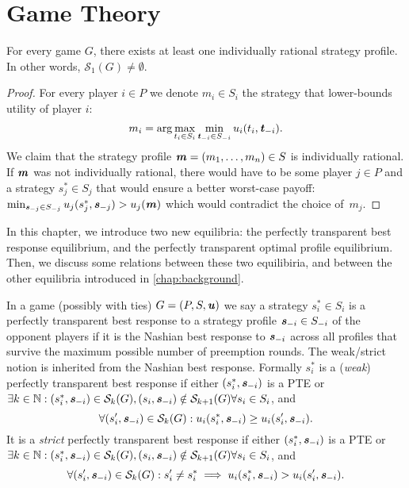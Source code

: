 \chapter{Game Theory}
\label{chap:game-theory}

\begin{lemma}
	For every game $G$, there exists at least one individually rational strategy profile.
	In other words, $\mathcal{S}_1(G) \ne \emptyset$.
\end{lemma}

\begin{proof}
	For every player $i \in P$ we denote $m_i \in S_i$ the strategy that lower-bounds utility of player $i$:
	\[
		m_i = \text{arg} \max_{t_i \in S_i} \min_{\boldsymbol{\mathit{t}}_{-i} \in S_{-i}} u_i(t_i, \boldsymbol{\mathit{t}}_{-i}).
	\]
	We claim that the strategy profile $\boldsymbol{\mathit{m}} = (m_1, \dots, m_n) \in S$ is individually rational.
	If $\boldsymbol{\mathit{m}}$ was not individually rational, there would have to be some player $j \in P$ and a strategy $s_j^* \in S_j$ that would ensure a better worst-case payoff: $\min_{\boldsymbol{\mathit{s}}_{-j} \in S_{-j}}u_j(s_j^*, \boldsymbol{\mathit{s}}_{-j}) > u_j(\boldsymbol{\mathit{m}})$ which would contradict the choice of~$m_j$.
\end{proof}

In this chapter, we introduce two new equilibria: the perfectly transparent best response equilibrium, and the perfectly transparent optimal profile equilibrium.
Then, we discuss some relations between these two equilibiria, and between the other equilibria introduced in \autoref{chap:background}.

\begin{definition}
	In a game (possibly with ties) $G = (P, S, \boldsymbol{\mathit{u}})$ we say a strategy $s_i^* \in S_i$ is a perfectly transparent best response to a strategy profile $\boldsymbol{\mathit{s}}_{-i} \in S_{-i}$ of the opponent players if it is the Nashian best response to $\boldsymbol{\mathit{s}}_{-i}$ across all profiles that survive the maximum possible number of preemption rounds.
	The weak/strict notion is inherited from the Nashian best response.
	Formally $s_i^*$ is a (\textit{weak}) perfectly transparent best response if either $(s_i^*, \boldsymbol{\mathit{s}}_{-i})$ is a PTE or $\exists k \in \mathbb{N}: (s_i^*, \boldsymbol{\mathit{s}}_{-i}) \in \mathcal{S}_k(G), (s_i, \boldsymbol{\mathit{s}}_{-i}) \notin \mathcal{S}_{k+1}(G) \forall s_i \in S_i$, and
	\[
		\forall (s_i', \boldsymbol{\mathit{s}}_{-i}) \in \mathcal{S}_k(G): u_i(s_i^*, \boldsymbol{\mathit{s}}_{-i}) \ge u_i(s_i', \boldsymbol{\mathit{s}}_{-i}).
	\]
	It is a \textit{strict} perfectly transparent best response if either $(s_i^*, \boldsymbol{\mathit{s}}_{-i})$ is a PTE or $\exists k \in \mathbb{N}: (s_i^*, \boldsymbol{\mathit{s}}_{-i}) \in \mathcal{S}_k(G), (s_i, \boldsymbol{\mathit{s}}_{-i}) \notin \mathcal{S}_{k+1}(G) \forall s_i \in S_i$, and
	\[
		\forall (s_i', \boldsymbol{\mathit{s}}_{-i}) \in \mathcal{S}_k(G): s_i' \ne s_i^* \implies u_i(s_i^*, \boldsymbol{\mathit{s}}_{-i}) > u_i(s_i', \boldsymbol{\mathit{s}}_{-i}).
	\]
\end{definition}

